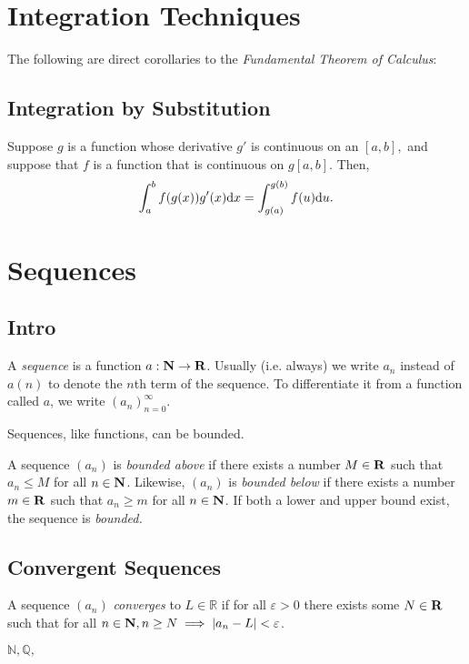 \documentclass{article}
\begin{document}
  \pagebreak


  \section{Integration Techniques}
  The following are direct corollaries to the \emph{Fundamental Theorem of Calculus}:

  \subsection{Integration by Substitution}
  \begin{thm}[u-substitution]
    Suppose \(g\) is a function whose derivative \(g'\) is continuous on an \([a,b],\) and suppose that \(f\) is a function that is continuous on \(g[a,b].\) Then, \[
      \int_{a}^{b}f(g(x))g'(x) \mathrm{d} x = \int_{g(a)}^{g(b)}f(u) \mathrm{d} u.
    \]
  \end{thm}

  \section{Sequences}
  \subsection{Intro}

  \begin{defi}[Sequence]
    A \emph{sequence} is a function \(a: \mathbf{N} \to \mathbf{R}\). Usually (i.e. always) we write \(a_n\) instead of \(a(n)\) to denote the \(n\)th term of the sequence. To differentiate it from a function called \(a\), we write \((a_n)_{n=0}^{\infty}\). 
    \end{defi}
    Sequences, like functions, can be bounded. 

    \begin{defi}[Boundedness]
      A sequence \((a_n)\) is \emph{bounded above} if there exists a number \(M \in \mathbf{R}\) such that \(a_n \leq M\) for all \(n \in \mathbf{N}\). Likewise, \((a_n)\) is \emph{bounded below} if there exists a number \(m \in \mathbf{R}\) such that \(a_n \geq m\) for all \(n \in \mathbf{N}\). If both a lower and upper bound exist, the sequence is \emph{bounded.}
    \end{defi}

    \subsection{Convergent Sequences}

    \begin{defi}
      A sequence \((a_n)\) \emph{converges} to \(L \in \mathds{R}\) if for all \(\varepsilon > 0\) there exists some \(N \in \mathbf{R}\) such that for all \(n \in \mathbf{N}, n \geq N \implies \left\lvert a_n - L\right\rvert < \varepsilon\).
    \end{defi}

    $\mathbb{N}, \mathbb{Q}, $
\end{document}
